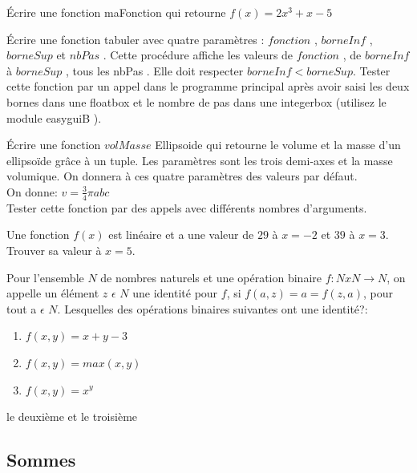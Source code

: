 \begin{exercise}
Écrire une fonction maFonction qui retourne $f(x) = 2x^{3} + x - 5$
\end{exercise}

\begin{exercise}
Écrire une fonction tabuler avec quatre paramètres : $fonction$ , $borneInf$ , $borneSup$
et $nbPas$ . Cette procédure affiche les valeurs de $fonction$ , de $borneInf$ à $borneSup$ ,
tous les nbPas . Elle doit respecter $borneInf < borneSup$.
Tester cette fonction par un appel dans le programme principal après avoir saisi les
deux bornes dans une floatbox et le nombre de pas dans une integerbox (utilisez le
module easyguiB ).
\end{exercise}

\begin{exercise}
Écrire une fonction $volMasse$ Ellipsoide qui retourne le volume et la masse d’un ellipsoïde grâce à un tuple. Les paramètres sont les trois demi-axes et la masse volumique. On donnera à ces quatre paramètres des valeurs par défaut. \\
On donne: $v = \frac{3}{4} \pi abc$ \\
Tester cette fonction par des appels avec différents nombres d’arguments.
\end{exercise}

\begin{exercise}
Une fonction $f (x)$ est lin\'eaire et a une valeur de $29$ \`a $x = -2$ et $39$ à $x = 3$. Trouver sa valeur à $x = 5$.
\end{exercise}

\begin{exercise}
Pour l'ensemble $N$ de nombres naturels et une opération binaire $f: N x N \longrightarrow N$, on appelle un élément $z$ $\epsilon$ $N$ une identité pour $f$, si $f (a, z) = a = f (z, a)$, pour tout a $\epsilon$ $N$. Lesquelles des opérations binaires suivantes ont une identité?:
\begin{enumerate}
  \item $f (x, y) = x + y - 3$
  \item $f (x, y) = max(x, y)$
  \item $f (x, y) = x^{y}$
\end{enumerate}
\end{exercise}
\begin{solution}
le deuxième et le troisième 
\end{solution}
 \subsection{Sommes}
